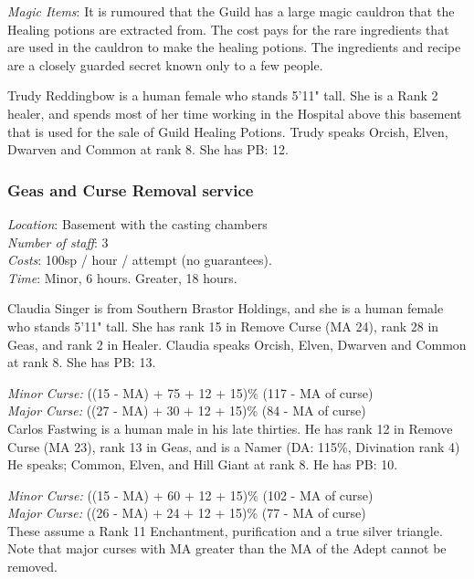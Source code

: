 \documentclass[twoside,a4paper]{article}
\begin{document}
\begin{multicols}{2}
\emph{Magic Items}: It is rumoured that the Guild has a large magic
cauldron that the Healing potions are extracted from. The cost pays
for the rare ingredients that are used in the cauldron to make the
healing potions. The ingredients and recipe are a closely guarded
secret known only to a few people.

Trudy Reddingbow is a human female who stands 5'11" tall. She is a
Rank 2 healer, and spends most of her time working in the Hospital
above this basement that is used for the sale of Guild Healing
Potions. Trudy speaks Orcish, Elven, Dwarven and Common at rank
8. She has PB: 12.

\subsubsection{Geas and Curse Removal service}

\begin{flushleft}
\emph{Location}: Basement with the casting chambers \\
\emph{Number of staff}: 3 \\
\emph{Costs}: 100sp / hour / attempt (no guarantees). \\
\emph{Time}: Minor, 6 hours. Greater, 18 hours. \\
\end{flushleft}

Claudia Singer is from Southern Brastor Holdings, and she is a human
female who stands 5'11" tall. She has rank 15 in Remove Curse (MA 24),
rank 28 in Geas, and rank 2 in Healer. Claudia speaks Orcish, Elven,
Dwarven and Common at rank 8. She has PB: 13.

\emph{Minor Curse:} ((15 - MA) + 75 + 12 + 15)\% (117 - MA of curse) \\
\emph{Major Curse:} ((27 - MA) + 30 + 12 + 15)\% (84 - MA of curse) \\

Carlos Fastwing is a human male in his late thirties. He has rank 12
in Remove Curse (MA 23), rank 13 in Geas, and is a Namer (DA: 115\%,
Divination rank 4) He speaks; Common, Elven, and Hill Giant at rank
8. He has PB: 10.

\emph{Minor Curse:} ((15 - MA) + 60 + 12 + 15)\% (102 - MA of curse) \\
\emph{Major Curse:} ((26 - MA) + 24 + 12 + 15)\% (77 - MA of curse) \\

These assume a Rank 11 Enchantment, purification and a true silver
triangle.  Note that major curses with MA greater than the MA of the
Adept cannot be removed.


\end{multicols}
\end{document}
